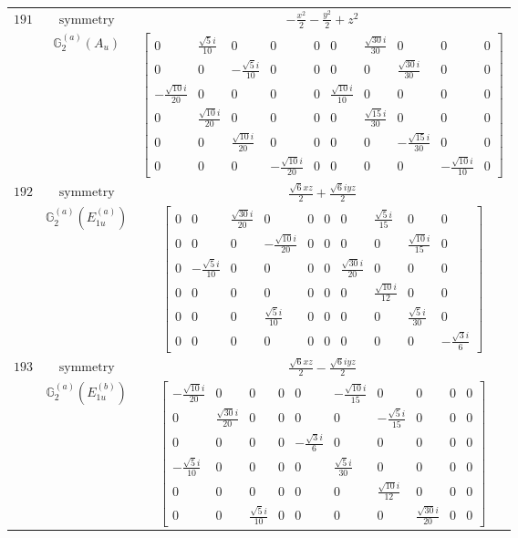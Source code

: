 \documentclass[fleqn,8pt,landscape]{jsarticle}
\begin{document}
\begin{longtable}{ccc}
$ 191 $ & $ \text{symmetry} $ & $ - \frac{x^{2}}{2} - \frac{y^{2}}{2} + z^{2} $ \\
$  $ & $ \mathbb{G}_{2}^{(a)}(A_{u}) $ & $ \begin{bmatrix} 0 & \frac{\sqrt{5} i}{10} & 0 & 0 & 0 & 0 & \frac{\sqrt{30} i}{30} & 0 & 0 & 0 \\ 0 & 0 & - \frac{\sqrt{5} i}{10} & 0 & 0 & 0 & 0 & \frac{\sqrt{30} i}{30} & 0 & 0 \\ - \frac{\sqrt{10} i}{20} & 0 & 0 & 0 & 0 & \frac{\sqrt{10} i}{10} & 0 & 0 & 0 & 0 \\ 0 & \frac{\sqrt{10} i}{20} & 0 & 0 & 0 & 0 & \frac{\sqrt{15} i}{30} & 0 & 0 & 0 \\ 0 & 0 & \frac{\sqrt{10} i}{20} & 0 & 0 & 0 & 0 & - \frac{\sqrt{15} i}{30} & 0 & 0 \\ 0 & 0 & 0 & - \frac{\sqrt{10} i}{20} & 0 & 0 & 0 & 0 & - \frac{\sqrt{10} i}{10} & 0 \end{bmatrix} $ \\ \hline
$ 192 $ & $ \text{symmetry} $ & $ \frac{\sqrt{6} x z}{2} + \frac{\sqrt{6} i y z}{2} $ \\
$  $ & $ \mathbb{G}_{2}^{(a)}(E_{1u}^{(a)}) $ & $ \begin{bmatrix} 0 & 0 & \frac{\sqrt{30} i}{20} & 0 & 0 & 0 & 0 & \frac{\sqrt{5} i}{15} & 0 & 0 \\ 0 & 0 & 0 & - \frac{\sqrt{10} i}{20} & 0 & 0 & 0 & 0 & \frac{\sqrt{10} i}{15} & 0 \\ 0 & - \frac{\sqrt{5} i}{10} & 0 & 0 & 0 & 0 & \frac{\sqrt{30} i}{20} & 0 & 0 & 0 \\ 0 & 0 & 0 & 0 & 0 & 0 & 0 & \frac{\sqrt{10} i}{12} & 0 & 0 \\ 0 & 0 & 0 & \frac{\sqrt{5} i}{10} & 0 & 0 & 0 & 0 & \frac{\sqrt{5} i}{30} & 0 \\ 0 & 0 & 0 & 0 & 0 & 0 & 0 & 0 & 0 & - \frac{\sqrt{3} i}{6} \end{bmatrix} $ \\ \hline
$ 193 $ & $ \text{symmetry} $ & $ \frac{\sqrt{6} x z}{2} - \frac{\sqrt{6} i y z}{2} $ \\
$  $ & $ \mathbb{G}_{2}^{(a)}(E_{1u}^{(b)}) $ & $ \begin{bmatrix} - \frac{\sqrt{10} i}{20} & 0 & 0 & 0 & 0 & - \frac{\sqrt{10} i}{15} & 0 & 0 & 0 & 0 \\ 0 & \frac{\sqrt{30} i}{20} & 0 & 0 & 0 & 0 & - \frac{\sqrt{5} i}{15} & 0 & 0 & 0 \\ 0 & 0 & 0 & 0 & - \frac{\sqrt{3} i}{6} & 0 & 0 & 0 & 0 & 0 \\ - \frac{\sqrt{5} i}{10} & 0 & 0 & 0 & 0 & \frac{\sqrt{5} i}{30} & 0 & 0 & 0 & 0 \\ 0 & 0 & 0 & 0 & 0 & 0 & \frac{\sqrt{10} i}{12} & 0 & 0 & 0 \\ 0 & 0 & \frac{\sqrt{5} i}{10} & 0 & 0 & 0 & 0 & \frac{\sqrt{30} i}{20} & 0 & 0 \end{bmatrix} $ \\ \hline

\end{longtable}
\end{document}

